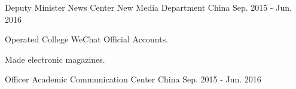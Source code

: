 


\begin{cventries}


\cventry
{Deputy Minister} %
{News Center New Media Department} %
{China} %
{Sep. 2015 - Jun. 2016} %
{ %
\begin{cvitems}
\item {Operated College WeChat Official Accounts.}
\item {Made electronic magazines.}
\end{cvitems}
}


\cventry
{Officer} %
{Academic Communication Center} %
{China} %
{Sep. 2015 - Jun. 2016} %
{ %
}


\end{cventries}